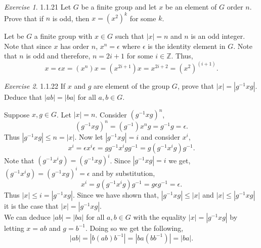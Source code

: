 \documentclass[12pt]{amsart}
\makeatletter
\theoremstyle{remark}
\newtheorem*{exercise}{Exercise}%
\def\ZZ{\ensuremath{\mathbb Z}}
\renewenvironment{proof}[1][\proofname]{\par\doublespacing
  \pushQED{\qed}%
  \normalfont \topsep6\p@\@plus6\p@\relax
  \list{}{%
    \settowidth{\leftmargin}{\itshape\proofname:\hskip\labelsep}%
    \setlength{\labelwidth}{0pt}%
    \setlength{\itemindent}{-\leftmargin}%
  }%
  \item[\hskip\labelsep\itshape#1\@addpunct{:}]\ignorespaces
}{%
  \popQED\endlist\@endpefalse
  \singlespacing
}
\theoremstyle{mycomment}
\makeatother
\begin{document}
\begin{exercise}{1.1.21} Let $G$ be a finite group and let $x$ be an element of $G$ order $n$. Prove that if $n$ is odd, then $x = (x^2)^k$ for some $k$.
  \begin{proof} Let be $G$ a finite group with $x \in G$ such that $|x| = n$ and $n$ is an odd integer. Note that since $x$ has order $n$,
    $x^n = \epsilon$ where $\epsilon$ is the identity element in $G$. Note that $n$ is odd and therefore, $n = 2i + 1$ for some $i \in \ZZ$. Thus, 
    \begin{equation*}
        x = \epsilon x = (x^n)x = (x^{2i + 1})x = x^{2i + 2} = (x^{2})^{(i + 1)}.
    \end{equation*}
  \end{proof}
\end{exercise}


\begin{exercise}{1.1.22} If $x$ and $g$ are element of the group $G$, prove that $|x| = |g^{-1}xg|$. Deduce that $|ab| = |ba|$ for all $a, b \in G$.\\
  \begin{proof} Suppose $x, g \in G$. Let $|x| = n$. Consider $(g^{-1}xg)^n$,
    \begin{equation*}
      (g^{-1}xg)^n = (g^{-1})x^ng = g^{-1}g = \epsilon.
    \end{equation*}
    Thus $|g^{-1}xg| \leq n = |x|$. Now let $|g^{-1}xg| = i$ and consider $x^i$,
    \begin{equation*}
      x^i = \epsilon x^i \epsilon = gg^{-1}x^igg^{-1} = g(g^{-1}x^ig)g^{-1}.
    \end{equation*}
    Note that $(g^{-1}x^ig) = (g^{-1}xg)^i$. Since $|g^{-1}xg| = i$ we get, $(g^{-1}x^ig) = (g^{-1}xg)^i = \epsilon$ and by substitution, 
    \begin{equation*}
      x^i =  g(g^{-1}x^ig)g^{-1} = g\epsilon g^{-1} = \epsilon. 
    \end{equation*}
    Thus $|x| \leq i = |g^{-1}xg|$. Since we have shown that, $|g^{-1}xg| \leq |x|$ and $|x| \leq |g^{-1}xg|$
    it is the case that $|x| = |g^{-1}xg|$.\\

    We can deduce $|ab| = |ba|$ for all $a, b \in G$ with the equality $|x| = |g^{-1}xg|$ by letting $x = ab$ and $g = b^{-1}$. Doing so we get the following, 
    \begin{equation*}
      |ab| = |b(ab)b^{-1}| = |ba(bb^{-1})| = |ba|.
    \end{equation*}
  \end{proof}
\end{exercise}
\end{document}
